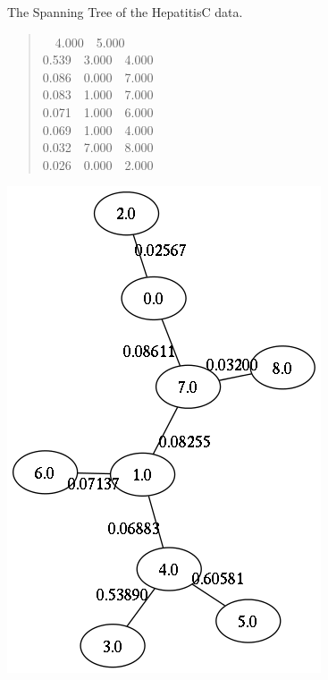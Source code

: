 \documentclass[a4paper]{article}
\begin{document}
The Spanning Tree of the HepatitisC data.
%
\begin{quote}{\ttfamily \raggedright {}~~4.000~~5.000\\
0.539~~3.000~~4.000\\
0.086~~0.000~~7.000\\
0.083~~1.000~~7.000\\
0.071~~1.000~~6.000\\
0.069~~1.000~~4.000\\
0.032~~7.000~~8.000\\
0.026~~0.000~~2.000
}
\end{quote}

\includegraphics[scale=0.500000]{span.png}
\end{document}

